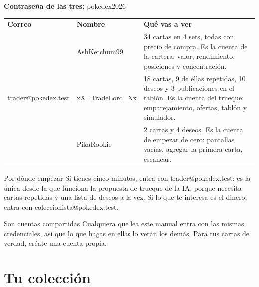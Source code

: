 \documentclass[11pt,a4paper]{article}
\newcommand{\thead}[1]{\sffamily\bfseries\footnotesize\color{paper}#1}
\newcommand{\cuenta}[1]{{\ttfamily\footnotesize #1}}
\begin{document}
\medskip
\noindent
{\sffamily\bfseries\small\color{graphite}Contraseña de las tres:}
{\ttfamily\small pokedex2026}

\vspace{0.5cm}

\noindent
\begin{tabularx}{\textwidth}{@{}>{\raggedright\arraybackslash}p{4.35cm} >{\raggedright\arraybackslash\sffamily\small}p{2.75cm} X@{}}
\rowcolor{graphite}
\thead{Correo} & \thead{Nombre} & \thead{Qué vas a ver} \\
\cuenta{coleccionista@pokedex.test} & AshKetchum99 &
  34 cartas en 4 sets, todas con precio de compra. Es la cuenta de la cartera:
  valor, rendimiento, posiciones y concentración. \\
\rowcolor{mist}
\cuenta{trader@pokedex.test} & xX\_TradeLord\_Xx &
  18 cartas, 9 de ellas repetidas, 10 deseos y 3 publicaciones en el tablón. Es
  la cuenta del trueque: emparejamiento, ofertas, tablón y simulador. \\
\cuenta{novato@pokedex.test} & PikaRookie &
  2 cartas y 4 deseos. Es la cuenta de empezar de cero: pantallas vacías,
  agregar la primera carta, escanear. \\
\bottomrule
\end{tabularx}

\vspace{0.35cm}

\begin{tipbox}{Por dónde empezar}
Si tienes cinco minutos, entra con \cuenta{trader@pokedex.test}: es la única
desde la que funciona la propuesta de trueque de la IA, porque necesita cartas
repetidas y una lista de deseos a la vez. Si lo que te interesa es el dinero,
entra con \cuenta{coleccionista@pokedex.test}.
\end{tipbox}

\begin{avisobox}{Son cuentas compartidas}
Cualquiera que lea este manual entra con las mismas credenciales, así que lo
que hagas en ellas lo verán los demás. Para tus cartas de verdad, créate una
cuenta propia.
\end{avisobox}

\clearpage
\section{Tu colección}
\end{document}
